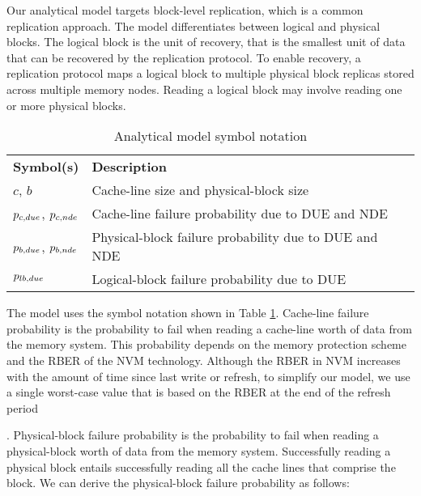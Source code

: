 Our analytical model targets block-level replication, which is a common replication approach. 
The model differentiates between logical and physical blocks.
The logical block is the unit of recovery, that is the smallest unit of data that can be recovered by the replication protocol.
To enable recovery, a replication protocol maps a logical block to multiple physical block replicas stored across multiple memory nodes.
Reading a logical block may involve reading one or more physical blocks. 



\begin{table}
\caption{Analytical model symbol notation}
\label{tab:model}
\vspace{-0.2cm}
\centering
\begin{tabular}{lp{6.5cm}}
\textbf{Symbol(s)} & \textbf{Description} \\
$c$, $b$        & \scriptsize{Cache-line size and physical-block size}\\
${p_{c,due}}$, ${p_{c,nde}}$  & \scriptsize{Cache-line failure probability due to DUE and NDE}\\
${p_{b,due}}$, ${p_{b,nde}}$  & \scriptsize{Physical-block failure probability due to DUE and NDE}\\
${p_{lb,due}}$  & \scriptsize{Logical-block failure probability due to DUE}\\
\end{tabular}
\vspace{-0.25cm}
\end{table}

The model uses the symbol notation shown in Table \ref{tab:model}.
%
Cache-line failure probability is the probability to fail when reading a cache-line worth of data from the memory system.
This probability depends on the memory protection scheme and the RBER of the NVM technology.
Although the RBER in NVM increases with the amount of time since last write or refresh, 
to simplify our model, we use a single worst-case value that is based on the RBER at the end of the refresh period. 
%
Physical-block failure probability is the probability to fail when reading a physical-block worth of data from the memory system.
Successfully reading a physical block entails successfully reading all the cache lines that comprise the block. 
We can derive the physical-block failure probability as follows:

